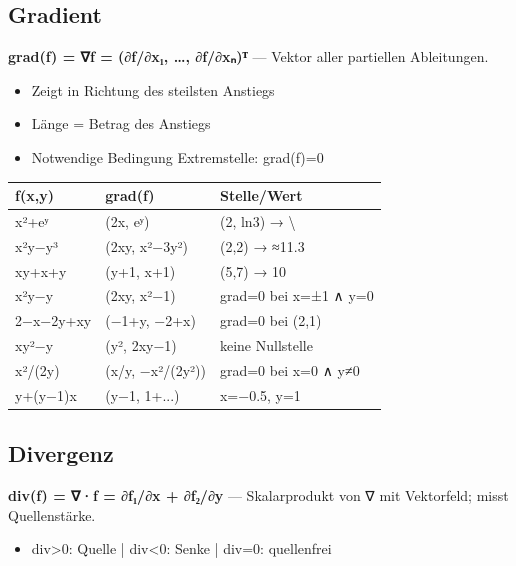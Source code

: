 \documentclass[11pt, a4paper]{article}
\begin{document}
\subsection{Gradient}
\textbf{grad(f) = ∇f = (∂f/∂x₁, …, ∂f/∂xₙ)ᵀ} — Vektor aller partiellen Ableitungen.

\begin{itemize}
  \item Zeigt in Richtung des steilsten Anstiegs
  \item Länge = Betrag des Anstiegs
  \item Notwendige Bedingung Extremstelle: grad(f)=0
\end{itemize}


{\small
\begin{tabularx}{\linewidth}{XXX}
\hline
\rowcolor{tableheadbg}
{\color{white}\textbf{f(x,y)}} & {\color{white}\textbf{grad(f)}} & {\color{white}\textbf{Stelle/Wert}} \\[2pt]
\hline
\endhead
\hline
\endfoot
x²+eʸ & (2x, eʸ) & (2, ln3) → \textbackslash{} \\
x²y−y³ & (2xy, x²−3y²) & (2,2) → ≈11.3 \\
xy+x+y & (y+1, x+1) & (5,7) → 10 \\
x²y−y & (2xy, x²−1) & grad=0 bei x=±1 ∧ y=0 \\
2−x−2y+xy & (−1+y, −2+x) & grad=0 bei (2,1) \\
xy²−y & (y², 2xy−1) & keine Nullstelle \\
x²/(2y) & (x/y, −x²/(2y²)) & grad=0 bei x=0 ∧ y≠0 \\
y+(y−1)x & (y−1, 1+...) & x=−0.5, y=1 \\
\end{tabularx}
}



\subsection{Divergenz}
\textbf{div(f) = ∇·f = ∂f₁/∂x + ∂f₂/∂y} — Skalarprodukt von ∇ mit Vektorfeld; misst Quellenstärke.

\begin{itemize}
  \item div>0: Quelle | div<0: Senke | div=0: quellenfrei
\end{itemize}
\end{document}
